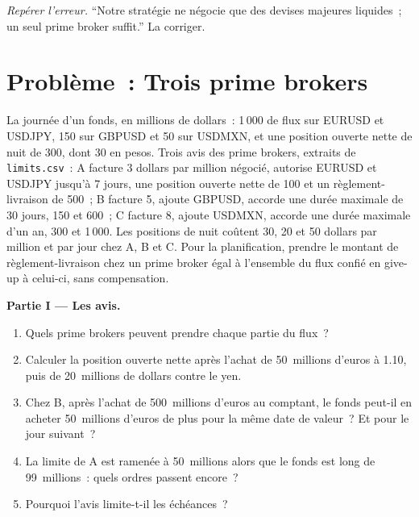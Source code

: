 \begin{exercise}[$\star\star\star$]\label{exo:m2:getting-access-fx:8}
\emph{Repérer l'erreur.} ``Notre stratégie ne négocie que des devises majeures liquides~; un seul prime broker
suffit.'' La corriger.
\end{exercise}

\section{Problème~: Trois prime brokers}

\begin{problem}\label{pb:m2:getting-access-fx:1}
La journée d'un fonds, en millions de dollars~: 1\,000 de flux sur EURUSD et USDJPY, 150 sur GBPUSD et 50
sur USDMXN, et une position ouverte nette de nuit de 300, dont 30 en pesos. Trois
avis des prime brokers, extraits de \texttt{limits.csv}~: A facture 3 dollars par million négocié,
autorise EURUSD et USDJPY jusqu'à 7 jours, une position ouverte nette de 100 et un règlement-livraison de 500~;
B facture 5, ajoute GBPUSD, accorde une durée maximale de 30 jours, 150 et 600~; C facture 8, ajoute USDMXN, accorde
une durée maximale d'un an, 300 et 1\,000. Les positions de nuit coûtent 30, 20 et 50 dollars par million et par jour
chez A, B et C. Pour la planification, prendre le montant de règlement-livraison chez un prime broker égal à
l'ensemble du flux confié en give-up à celui-ci, sans compensation.

\medskip\noindent\textbf{Partie I --- Les avis.}
\begin{enumerate}
\item Quels prime brokers peuvent prendre chaque partie du flux~?
\item Calculer la position ouverte nette après l'achat de 50~millions d'euros à 1.10, puis de
20~millions de dollars contre le yen.
\item Chez B, après l'achat de 500~millions d'euros au comptant, le fonds peut-il en acheter 50~millions d'euros de plus pour
la même date de valeur~? Et pour le jour suivant~?
\item La limite de A est ramenée à 50~millions alors que le fonds est long de 99~millions~: quels ordres
passent encore~?
\item Pourquoi l'avis limite-t-il les échéances~?
\end{enumerate}


\end{problem}

